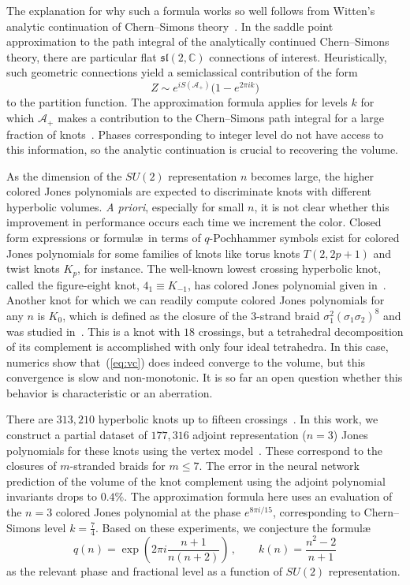 \documentclass[11pt]{article}
\newcommand{\eref}[1]{(\ref{#1})}
\begin{document}
The explanation for why such a formula works so well follows from Witten's analytic continuation of Chern--Simons theory~\cite{witten2011analytic}.
In the saddle point approximation to the path integral of the analytically continued Chern--Simons theory, there are particular flat $\mathfrak{sl}(2,\mathbb{C})$ connections of interest.
Heuristically, such geometric connections yield a semiclassical contribution of the form
\begin{equation}
Z \sim e^{iS(\mathcal{A}_+)} \big( 1 - e^{2\pi i k} \big)
\end{equation}
to the partition function.
The approximation formula applies for levels $k$ for which $\mathcal{A}_+$ makes a contribution to the Chern--Simons path integral for a large fraction of knots~\cite{Craven:2020bdz}.
Phases corresponding to integer level do not have access to this information, so the analytic continuation is crucial to recovering the volume.

As the dimension of the $SU(2)$ representation $n$ becomes large, the higher colored Jones polynomials are expected to discriminate knots with different hyperbolic volumes.
\textit{A priori}, especially for small $n$, it is not clear whether this improvement in performance occurs each time we increment the color.
Closed form expressions or formul\ae\ in terms of $q$-Pochhammer symbols exist for colored Jones polynomials for some families of knots like torus knots $T(2,2p+1)$ and twist knots $K_p$,
for instance.  The well-known lowest crossing hyperbolic knot, called the figure-eight knot, $4_1\equiv K_{-1}$, has colored Jones polynomial  given in~\cite{Le:2000, Habiro:2000}.
Another knot for which we can readily compute colored Jones polynomials for any $n$ is $K_0$, which is defined as the closure of the $3$-strand braid $\sigma_1^2 (\sigma_1 \sigma_2)^8$ and was studied in~\cite{Garoufalidis:2004}.
This is a knot with $18$ crossings, but a tetrahedral decomposition of its complement is accomplished with only four ideal tetrahedra.
In this case, numerics show that~\eref{eq:vc} does indeed converge to the volume, but this convergence is slow and non-monotonic. It is so far an open question whether this behavior is characteristic or an aberration.

There are $313{,} 210$ hyperbolic knots up to fifteen crossings~\cite{hoste1998first}.
In this work, we construct a partial dataset of $177 {,}316$ adjoint representation ($n=3$) Jones polynomials for these knots using the vertex model~\cite{Akutsu:1987dz,Ramadevi2017}.
These correspond to the closures of $m$-stranded braids for $m\le 7$.
The error in the neural network prediction of the volume of the knot complement using the adjoint polynomial invariants drops to $0.4\%$.
The approximation formula here uses an evaluation of the $n=3$ colored Jones polynomial at the phase $e^{8\pi i/15}$, corresponding to Chern--Simons level $k=\frac74$.
Based on these experiments, we conjecture the formul\ae
\begin{equation}        \label{eq:best-phase-guess}
q(n) = \exp\left( 2\pi i \frac{n+1}{n(n+2)} \right) \,, \qquad k(n) = \frac{n^2-2}{n+1}
\end{equation}
as the relevant phase and fractional level as a function of $SU(2)$ representation.
\end{document}
